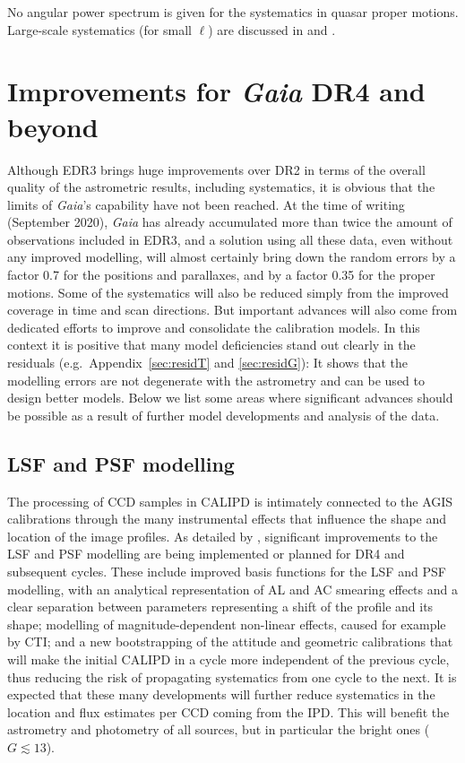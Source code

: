 \documentclass[longauth]{aa} %
\begin{document}
No angular power spectrum is given for the systematics in quasar proper motions.
Large-scale systematics (for small $\ell$) are discussed in \citet{EDR3-DPACP-133} 
and \citet{EDR3-DPACP-134}.


\section{Improvements for \textit{Gaia} DR4 and beyond}
\label{sec:impr} 

Although EDR3 brings huge improvements over DR2 in terms of the overall quality of the astrometric
results, including systematics, it is obvious that the limits of \textit{Gaia}'s capability have not
been reached. At the time of writing (September 2020), \textit{Gaia} has already accumulated more 
than twice the amount of observations included in EDR3, and a solution using all these data, even 
without any improved modelling, will almost certainly bring down the random errors by a factor 0.7 for
the positions and parallaxes, and by a factor 0.35 for the proper motions. Some of the
systematics will also be reduced simply from the improved coverage in time and scan directions. 
But important advances will also come from dedicated efforts to improve and consolidate
the calibration models. In this context it is positive that many model deficiencies stand 
out clearly in the residuals (e.g.\ Appendix~\ref{sec:residT} and \ref{sec:residG}): It shows 
that the modelling errors are not degenerate with the astrometry and can be used to design 
better models. Below we list some areas where significant advances should 
be possible as a result of further model developments and analysis of the data.


\subsection{LSF and PSF modelling}
\label{sec:imprLSF}
 
The processing of CCD samples in CALIPD is intimately connected to the AGIS calibrations through 
the many instrumental effects that influence the shape and location of the image profiles. 
As detailed by \citet{EDR3-DPACP-73}, significant improvements to the LSF and PSF modelling are 
being implemented or planned for DR4 and subsequent cycles. These include improved basis 
functions for the LSF and PSF modelling, with an analytical representation of AL and AC smearing 
effects and a clear separation between parameters representing a shift of the profile and 
its shape; modelling of magnitude-dependent non-linear effects, caused for example by CTI; 
and a new bootstrapping of the attitude and geometric calibrations that will make the initial
CALIPD in a cycle more independent of the previous cycle, thus reducing the risk of 
propagating systematics from one cycle to the next. It is expected that these many developments
will further reduce systematics in the location and flux estimates per CCD coming from the IPD.
This will benefit the astrometry and photometry of all sources, but in particular the bright 
ones ($G\lesssim 13$). 
\end{document}
